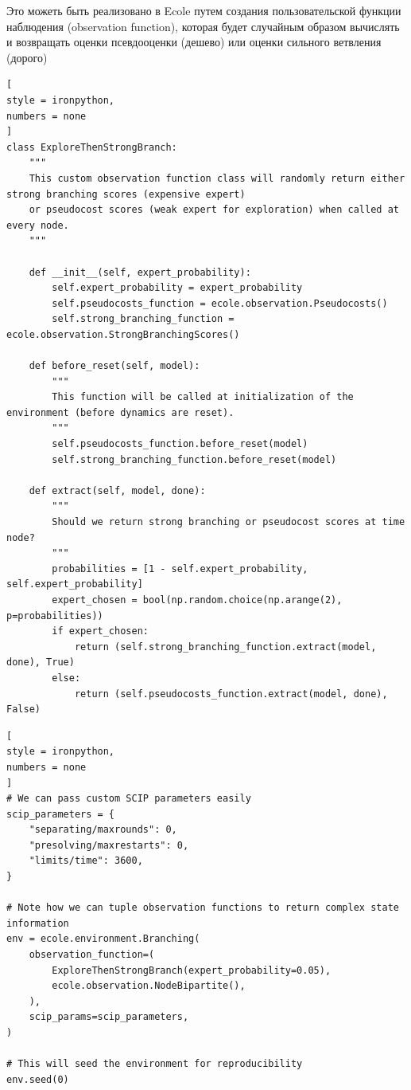 \documentclass[%
	11pt,
	a4paper,
	utf8,
		]{article}
\begin{document}
Это можеть быть реализовано в Ecole путем создания пользовательской функции наблюдения (observation function), которая будет случайным образом вычислять и возвращать оценки псевдооценки (дешево) или оценки сильного ветвления (дорого)
\begin{lstlisting}[
style = ironpython,
numbers = none	
]
class ExploreThenStrongBranch:
	"""
	This custom observation function class will randomly return either strong branching scores (expensive expert)
	or pseudocost scores (weak expert for exploration) when called at every node.
	"""

	def __init__(self, expert_probability):
		self.expert_probability = expert_probability
		self.pseudocosts_function = ecole.observation.Pseudocosts()
		self.strong_branching_function = ecole.observation.StrongBranchingScores()

	def before_reset(self, model):
		"""
		This function will be called at initialization of the environment (before dynamics are reset).
		"""
		self.pseudocosts_function.before_reset(model)
		self.strong_branching_function.before_reset(model)

	def extract(self, model, done):
		"""
		Should we return strong branching or pseudocost scores at time node?
		"""
		probabilities = [1 - self.expert_probability, self.expert_probability]
		expert_chosen = bool(np.random.choice(np.arange(2), p=probabilities))
		if expert_chosen:
			return (self.strong_branching_function.extract(model, done), True)
		else:
			return (self.pseudocosts_function.extract(model, done), False)
\end{lstlisting}

\begin{lstlisting}[
style = ironpython,
numbers = none
]
# We can pass custom SCIP parameters easily
scip_parameters = {
	"separating/maxrounds": 0,
	"presolving/maxrestarts": 0,
	"limits/time": 3600,
}

# Note how we can tuple observation functions to return complex state information
env = ecole.environment.Branching(
	observation_function=(
		ExploreThenStrongBranch(expert_probability=0.05),
		ecole.observation.NodeBipartite(),
	),
	scip_params=scip_parameters,
)

# This will seed the environment for reproducibility
env.seed(0)
\end{lstlisting}
\end{document}
